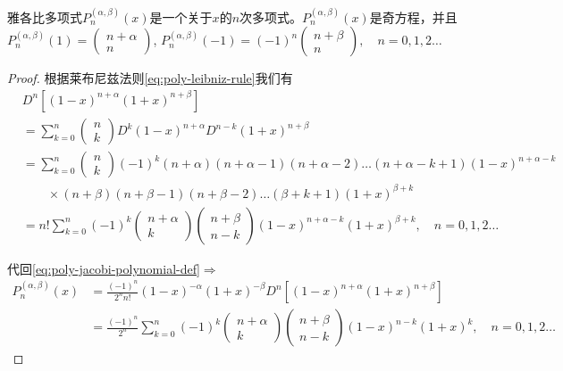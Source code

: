 \begin{subappendices}
\begin{theorem}
  \label{theorem:poly-jacobi-properties}
  雅各比多项式$P_n^{(\alpha,\beta)}(x)$是一个关于$x$的$n$次多项式。$P_n^{(\alpha,\beta)}(x)$是奇方程，并且$P_n^{(\alpha,\beta)}(1) = \begin{pmatrix} n+\alpha \\ n \end{pmatrix}$, $P_n^{(\alpha,\beta)}(-1) = (-1)^n \begin{pmatrix} n+\beta \\ n \end{pmatrix}, \quad n=0,1,2\ldots$
\end{theorem}
\begin{proof}
  根据莱布尼兹法则\eqref{eq:poly-leibniz-rule}我们有
  \begin{equation*}
    \begin{split}
      &D^n \left[  (1-x)^{n+\alpha} (1+x)^{n+\beta} \right] \\
      &= \sum_{k=0}^{n} \begin{pmatrix}
      n \\ k
      \end{pmatrix}
      D^k (1-x)^{n+\alpha} D^{n-k} (1+x)^{n+\beta} \\
      &=\sum_{k=0}^{n} \begin{pmatrix}
      n \\ k
      \end{pmatrix} (-1)^k
      (n+\alpha) (n+\alpha-1) (n+\alpha-2) \ldots (n+\alpha-k+1) (1-x)^{n+\alpha-k} \\
      &\qquad \times  (n+\beta) (n+\beta-1) (n+\beta-2) \ldots (\beta+k+1) (1+x)^{\beta+k} \\
      &=n! \sum_{k=0}^{n} (-1)^k \begin{pmatrix}
      n+\alpha \\ k
      \end{pmatrix}
      \begin{pmatrix}
        n+\beta \\ n-k
      \end{pmatrix}
      (1-x)^{n+\alpha - k} (1+x)^{\beta + k}, \quad n=0,1,2\ldots
    \end{split}
  \end{equation*}

代回\eqref{eq:poly-jacobi-polynomial-def}$\Rightarrow$
\begin{equation}
  \label{eq:poly-jacobi-poly-degree-n}
  \begin{split}
    P_n^{(\alpha,\beta)} (x) &= \frac{(-1)^n}{2^n n!} (1-x)^{-\alpha} (1+x)^{-\beta} D^n \left[ (1-x)^{n+\alpha} (1+x)^{n+\beta} \right] \\
    &= \frac{(-1)^n}{2^n} \sum_{k=0}^{n} (-1)^k \begin{pmatrix}
    n+\alpha \\ k
    \end{pmatrix}
    \begin{pmatrix}
      n+\beta \\ n-k
    \end{pmatrix}
    (1-x)^{n- k} (1+x)^k, \quad n=0,1,2\ldots
  \end{split}
\end{equation}


\end{proof}
\end{subappendices}
